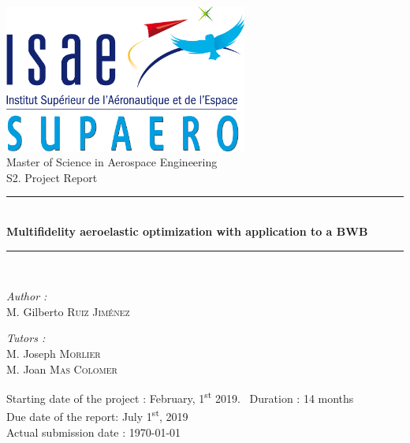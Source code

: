 \documentclass[a4paper,12pt,twoside]{article}
\theoremstyle{break}
\begin{document}

\begin{titlepage}
\begin{center}

\includegraphics[width=0.6\textwidth]{logo-isae-supaero}\\[1cm]

{\large Master of Science in Aerospace Engineering}\\[0.5cm]

{\large S2. Project Report}\\[0.5cm]

\rule{\linewidth}{0.5mm} \\[0.4cm]
{ \huge \bfseries Multifidelity aeroelastic optimization with application to a BWB \\[0.4cm] }
\rule{\linewidth}{0.5mm} \\[1.5cm]

\noindent
\begin{minipage}{0.4\textwidth}
  \begin{flushleft} \large
    \emph{Author :}\\
    M. Gilberto \textsc{Ruiz Jiménez}\\
  \end{flushleft}
\end{minipage}%
\begin{minipage}{0.4\textwidth}
  \begin{flushright} \large
    \emph{Tutors :} \\
    M. Joseph \textsc{Morlier}\\
    M. Joan \textsc{Mas Colomer}
  \end{flushright}
\end{minipage}

\vfill

{\large Starting date of the project : February, 1\textsuperscript{st} 2019. \, Duration : 14 months \\Due date of the report: July 1\textsuperscript{st}, 2019 \\ Actual submission date : \today}

\end{center}
\end{titlepage}
\end{document}
